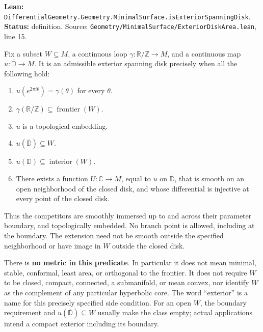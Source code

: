 \documentclass[
  letterpaper,
  11pt]{article}
\providecommand{\tightlist}{%
  \setlength{\itemsep}{0pt}\setlength{\parskip}{0pt}}
\begin{document}
\textbf{Lean:}
{\small\texttt{Differential\allowbreak{}Geometry.\allowbreak{}Geometry.\allowbreak{}Minimal\allowbreak{}Surface.\allowbreak{}is\allowbreak{}Exterior\allowbreak{}Spanning\allowbreak{}Disk}}.
\textbf{Status:} definition. Source:
{\small\texttt{Geometry/\allowbreak{}Minimal\allowbreak{}Surface/\allowbreak{}Exterior\allowbreak{}Disk\allowbreak{}Area.\allowbreak{}lean}},
line 15.

Fix a subset \(W\subseteq M\), a continuous loop
\(\gamma:\mathbb R/\mathbb Z\to M\), and a continuous map
\(u:\overline{\mathbb D}\to M\). It is an admissible exterior spanning
disk precisely when all the following hold:

\begin{enumerate}
\def\labelenumi{\arabic{enumi}.}
\tightlist
\item
  \(u(e^{2\pi i\theta})=\gamma(\theta)\) for every \(\theta\).
\item
  \(\gamma(\mathbb R/\mathbb Z)\subseteq\operatorname{frontier}(W)\).
\item
  \(u\) is a topological embedding.
\item
  \(u(\overline{\mathbb D})\subseteq W\).
\item
  \(u(\mathbb D)\subseteq\operatorname{interior}(W)\).
\item
  There exists a function \(U:\mathbb C\to M\), equal to \(u\) on
  \(\overline{\mathbb D}\), that is smooth on an open neighborhood of
  the closed disk, and whose differential is injective at every point of
  the closed disk.
\end{enumerate}

Thus the competitors are smoothly immersed up to and across their
parameter boundary, and topologically embedded. No branch point is
allowed, including at the boundary. The extension need not be smooth
outside the specified neighborhood or have image in \(W\) outside the
closed disk.

There is \textbf{no metric in this predicate}. In particular it does not
mean minimal, stable, conformal, least area, or orthogonal to the
frontier. It does not require \(W\) to be closed, compact, connected, a
submanifold, or mean convex, nor identify \(W\) as the complement of any
particular hyperbolic core. The word ``exterior'' is a name for this
precisely specified side condition. For an open \(W\), the boundary
requirement and \(u(\overline{\mathbb D})\subseteq W\) usually make the
class empty; actual applications intend a compact exterior including its
boundary.
\end{document}

